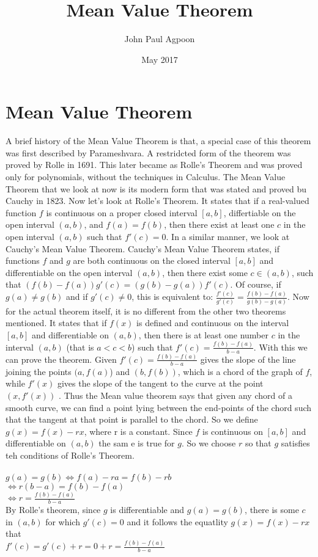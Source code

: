 \documentclass{article}
\title{Mean Value Theorem}
\author{John Paul Agpoon }
\date{May 2017}
\begin{document}
\maketitle

\section{Mean Value Theorem}
A brief history of the Mean Value Theorem is that, a special case of this theorem was first described by Parameshvara. A restridcted form of the theorem was proved by Rolle in 1691. This later became as Rolle's Theorem and was proved only for polynomials, without the techniques in Calculus. The Mean Value Theorem that we look at now is its modern form that was stated and proved bu Cauchy in 1823. Now let's look at Rolle's Theorem. It states that if a real-valued function $f$ is continuous on a proper closed interval ${[a,b]}$, differtiable on the open interval ${(a,b)}$, and ${f(a)=f(b)}$, then there exist at least one $c$ in the open interval $(a,b)$ such that $f'(c)=0$. In a similar manner, we look at Cauchy's Mean Value Theorem. Cauchy's Mean Value Theorem states, if functions $f$ and $g$ are both continuous on the closed interval $[a,b]$ and differentiable on the open interval $(a,b)$, then there exist some $c \in (a,b)$, such that ${\displaystyle (f(b)-f(a))g'(c)=(g(b)-g(a))f'(c).}$ Of course, if $g(a) \neq g(b)$ and if $g′(c) \neq 0$, this is equivalent to: ${\displaystyle {\frac {f'(c)}{g'(c)}}={\frac {f(b)-f(a)}{g(b)-g(a)}}.}$ Now for the actual theorem itself, it is no different from the other two theorems mentioned. It states that if $f(x)$ is defined and continuous on the interval $[a,b]$ and differentiable on $(a,b)$, then there is at least one number $c$ in the interval $(a,b)$ (that is $a<c<b$) such that $f'(c) = \frac{f(b)-f(a)}{b-a}$. With this we can prove the theorem. Given $f'(c) = \frac{f(b)-f(a)}{b-a}$ gives the slope of the line joining the points $(a, f(a)$) and $(b, f(b))$, which is a chord of the graph of $f$, while $f'(x)$ gives the slope of the tangent to the curve at the point $(x, f'(x))$ . Thus the Mean value theorem says that given any chord of a smooth curve, we can find a point lying between the end-points of the chord such that the tangent at that point is parallel to the chord. So we define  $g(x) = f(x)-rx$, where r is a constant. Since $f$ is continuous on $[a,b]$ and differentiable on $(a,b)$ the sam e is true for $g$. So we choose $r$ so that $g$ satisfies teh conditions of Rolle's Theorem.
\\
\\
$ g(a) = g(b) \Leftrightarrow f(a)-ra = f(b)-rb$
\\
$\Leftrightarrow r(b-a) = f(b)-f(a)$
\\
$\Leftrightarrow r = \frac{f(b)-f(a)}{b-a}$
\\
By Rolle's theorem, since $g$ is differentiable and $g(a) = g(b)$, there is some $c$ in  $(a,b)$ for which $g'(c)=0$ and it follows the equatlity $g(x)=f(x)-rx$ that \\
${\displaystyle f'(c)=g'(c)+r=0+r={\frac {f(b)-f(a)}{b-a}}}$
\end{document}
